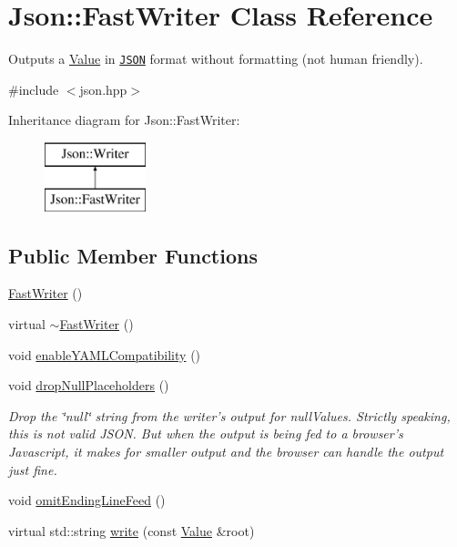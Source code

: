 \hypertarget{class_json_1_1_fast_writer}{\section{Json\-:\-:Fast\-Writer Class Reference}
\label{class_json_1_1_fast_writer}
}


Outputs a \hyperlink{class_json_1_1_value}{Value} in \href{http://www.json.org}{\tt J\-S\-O\-N} format without formatting (not human friendly).  




{\ttfamily \#include $<$json.\-hpp$>$}

Inheritance diagram for Json\-:\-:Fast\-Writer\-:\begin{figure}[H]
\begin{center}
\leavevmode
\includegraphics[height=2.000000cm]{class_json_1_1_fast_writer}
\end{center}
\end{figure}
\subsection*{Public Member Functions}
\begin{DoxyCompactItemize}
\item 
\hyperlink{class_json_1_1_fast_writer_a1bbc73ce1a1cc7b09cd1e02db3905170}{Fast\-Writer} ()
\item 
virtual \hyperlink{class_json_1_1_fast_writer_a7eb61405d041a915e5e980be97a707aa}{$\sim$\-Fast\-Writer} ()
\item 
void \hyperlink{class_json_1_1_fast_writer_a78d98e9f76d33660ad6e6a1abe287d45}{enable\-Y\-A\-M\-L\-Compatibility} ()
\item 
void \hyperlink{class_json_1_1_fast_writer_a6e93d8dce951e408517311026a065b40}{drop\-Null\-Placeholders} ()
\begin{DoxyCompactList}\small\item\em Drop the \char`\"{}null\char`\"{} string from the writer's output for null\-Values. Strictly speaking, this is not valid J\-S\-O\-N. But when the output is being fed to a browser's Javascript, it makes for smaller output and the browser can handle the output just fine. \end{DoxyCompactList}\item 
void \hyperlink{class_json_1_1_fast_writer_af4ee077d365d75941fb2688d97207a55}{omit\-Ending\-Line\-Feed} ()
\item 
virtual std\-::string \hyperlink{class_json_1_1_fast_writer_aa66218a56447222f91d64db618935a19}{write} (const \hyperlink{class_json_1_1_value}{Value} \&root)
\end{DoxyCompactItemize}


